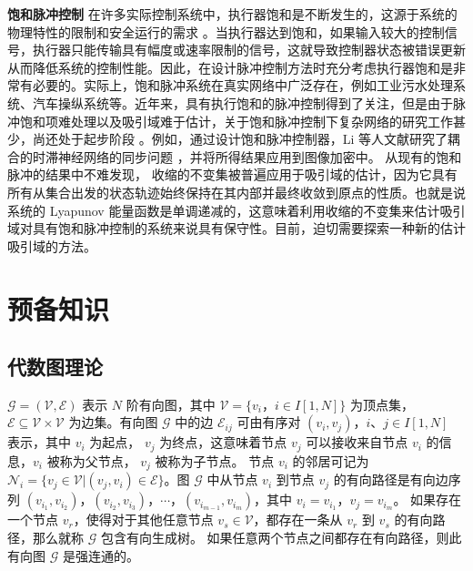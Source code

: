  
 \textbf{饱和脉冲控制}    在许多实际控制系统中，执行器饱和是不断发生的，这源于系统的物理特性的限制和安全运行的需求 \cite{brieger2009flight92,farantatos2015predictive1826,xiao2011adaptive1605}。当执行器达到饱和，如果输入较大的控制信号，执行器只能传输具有幅度或速率限制的信号，这就导致控制器状态被错误更新从而降低系统的控制性能。因此，在设计脉冲控制方法时充分考虑执行器饱和是非常有必要的。实际上，饱和脉冲系统在真实网络中广泛存在，例如工业污水处理系统、汽车操纵系统等。近年来，具有执行饱和的脉冲控制得到了关注，但是由于脉冲饱和项难处理以及吸引域难于估计，关于饱和脉冲控制下复杂网络的研究工作甚少，尚还处于起步阶段 
 \cite{li2020impulsive,li2020impulsivePolytopic,2019dynamic1699,shen2019estimation,HE2021126452,ouyang2020impulsive}。例如，通过设计饱和脉冲控制器，Li 等人文献研究了耦合的时滞神经网络的同步问题  \cite{ouyang2020impulsive}，并将所得结果应用到图像加密中。
从现有的饱和脉冲的结果中不难发现， 收缩的不变集被普遍应用于吸引域的估计，因为它具有所有从集合出发的状态轨迹始终保持在其内部并最终收敛到原点的性质。也就是说系统的 Lyapunov 能量函数是单调递减的，这意味着利用收缩的不变集来估计吸引域对具有饱和脉冲控制的系统来说具有保守性。目前，迫切需要探索一种新的估计吸引域的方法。
\section{预备知识}
\subsection{代数图理论}
$\mathcal{G}=(\mathcal{V},\mathcal{E})$ 表示 $N$ 阶有向图，其中 $\mathcal{V}=\{v_i$，$i\in I[1,N]\}$ 为顶点集，  $\mathcal{E}\subseteq\mathcal{V}\times\mathcal{V}$ 为边集。有向图 $\mathcal{G}$ 中的边 $\mathcal{E}_{ij}$ 可由有序对 $ (v_i,v_j)$，$i$、$j\in I[1,N] $ 表示，其中 $v_i$ 为起点，  $v_j$ 为终点，这意味着节点 $v_j$ 可以接收来自节点 $v_i$ 的信息，$v_i$ 被称为父节点， $v_j$ 被称为子节点。
节点 $v_i$ 的邻居可记为 $\mathcal{N}_i=\{v_j\in \mathcal{V}|(v_j,v_i)\in\mathcal{E}\}$。图 $\mathcal{G}$ 中从节点 $v_i$ 到节点 $v_j$ 的有向路径是有向边序列 $(v_{i_1},v_{i_2})$，$(v_{i_2},v_{i_3})$，$\cdots$，$(v_{i_{m-1}},v_{i_m})$，其中 $v_i=v_{i_1}$，$v_j=v_{i_m}$。
如果存在一个节点 $v_r$，使得对于其他任意节点 $v_s\in\mathcal{V}$，都存在一条从 $v_r$ 到 $v_s$ 的有向路径，那么就称 $\mathcal{G}$ 包含有向生成树。
如果任意两个节点之间都存在有向路径，则此有向图 $\mathcal{G}$ 是强连通的。

